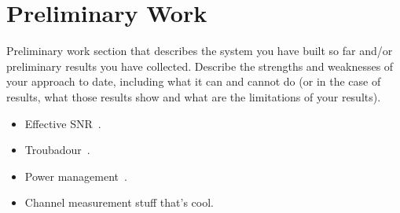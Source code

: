 \section{Preliminary Work}
Preliminary work section that describes the system you have built so
far and/or preliminary results you have collected. Describe the
strengths and weaknesses of your approach to date, including what it can
and cannot do (or in the case of results, what those results show and
what are the limitations of your results).

\begin{itemize}
\item Effective SNR~\cite{halperin_esnr}.
\item Troubadour~\cite{halperin_troubadour}.
\item Power management~\cite{halperin_power}.
\item Channel measurement stuff that's cool.
\end{itemize}
